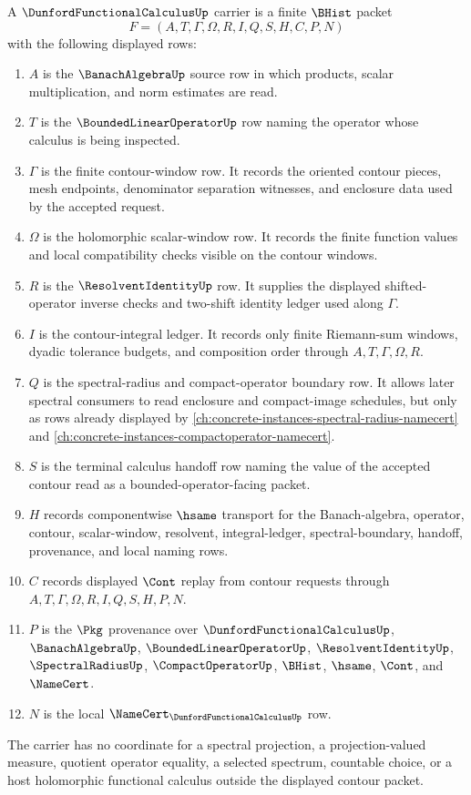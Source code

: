 \begin{definition}
\label{def:dunford-functional-calculus-carrier}
A $\DunfordFunctionalCalculusUp$ carrier is a finite $\BHist$ packet
$$
F=(A,T,\Gamma,\Omega,R,I,Q,S,H,C,P,N)
$$
with the following displayed rows:
\begin{enumerate}
\item $A$ is the $\BanachAlgebraUp$ source row in which products, scalar multiplication, and norm estimates are read.
\item $T$ is the $\BoundedLinearOperatorUp$ row naming the operator whose calculus is being inspected.
\item $\Gamma$ is the finite contour-window row. It records the oriented contour pieces, mesh endpoints, denominator separation witnesses, and enclosure data used by the accepted request.
\item $\Omega$ is the holomorphic scalar-window row. It records the finite function values and local compatibility checks visible on the contour windows.
\item $R$ is the $\ResolventIdentityUp$ row. It supplies the displayed shifted-operator inverse checks and two-shift identity ledger used along $\Gamma$.
\item $I$ is the contour-integral ledger. It records only finite Riemann-sum windows, dyadic tolerance budgets, and composition order through $A,T,\Gamma,\Omega,R$.
\item $Q$ is the spectral-radius and compact-operator boundary row. It allows later spectral consumers to read enclosure and compact-image schedules, but only as rows already displayed by \autoref{ch:concrete-instances-spectral-radius-namecert} and \autoref{ch:concrete-instances-compactoperator-namecert}.
\item $S$ is the terminal calculus handoff row naming the value of the accepted contour read as a bounded-operator-facing packet.
\item $H$ records componentwise $\hsame$ transport for the Banach-algebra, operator, contour, scalar-window, resolvent, integral-ledger, spectral-boundary, handoff, provenance, and local naming rows.
\item $C$ records displayed $\Cont$ replay from contour requests through $A,T,\Gamma,\Omega,R,I,Q,S,H,P,N$.
\item $P$ is the $\Pkg$ provenance over $\DunfordFunctionalCalculusUp$, $\BanachAlgebraUp$, $\BoundedLinearOperatorUp$, $\ResolventIdentityUp$, $\SpectralRadiusUp$, $\CompactOperatorUp$, $\BHist$, $\hsame$, $\Cont$, and $\NameCert$.
\item $N$ is the local $\NameCert_{\DunfordFunctionalCalculusUp}$ row.
\end{enumerate}
The carrier has no coordinate for a spectral projection, a projection-valued measure, quotient operator equality, a selected spectrum, countable choice, or a host holomorphic functional calculus outside the displayed contour packet.
\end{definition}

